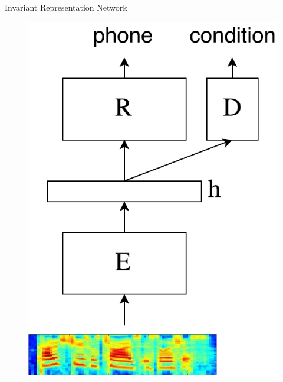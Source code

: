\documentclass[final]{beamer}
\newlength{\onecolwid}
\newlength{\twocolwid}
\begin{document}
\begin{frame}[t]
\begin{columns}[t]
\begin{column}{\twocolwid}
\begin{columns}[t]
\begin{column}{\onecolwid}
\begin{block}{{\Large Invariant Representation Network}}
                \begin{figure}
                    \centering
                    \includegraphics[width=0.9\linewidth]{model.pdf}
                \end{figure}


\end{block}
\end{column}
\end{columns}
\end{column}
\end{columns}
\end{frame}
\end{document}
